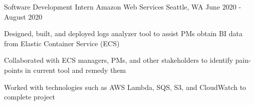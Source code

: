 

\begin{cventries}


  \cventry
    {Software Development Intern}
    {Amazon Web Services}
    {Seattle, WA}
    {June 2020 - August 2020}
    {
      \begin{cvitems}
        \item {Designed, built, and deployed logs analyzer tool to assist PMs obtain BI data from Elastic Container Service (ECS)}
        \item {Collaborated with ECS managers, PMs, and other stakeholders to identify pain-points in current tool and remedy them}
        \item {Worked with technologies such as AWS Lambda, SQS, S3, and CloudWatch to complete project}
      \end{cvitems}
    }


\end{cventries}
